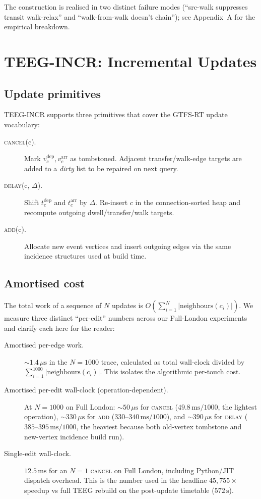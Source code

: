 \documentclass[letterpaper]{article}
\theoremstyle{definition}
\theoremstyle{plain}
\begin{document}
The construction is realised in two distinct failure modes
(``src-walk suppresses transit walk-relax'' and ``walk-from-walk
doesn't chain''); see Appendix~A for the empirical breakdown.

\section{TEEG-INCR: Incremental Updates}
\label{sec:teeg-incr}

\subsection{Update primitives}

TEEG-INCR supports three primitives that cover the GTFS-RT update vocabulary:
\begin{description}
\item[\textsc{cancel}(c).] Mark $v^\text{dep}_c, v^\text{arr}_c$ as
tombstoned. Adjacent transfer/walk-edge targets are added to a
\emph{dirty} list to be repaired on next query.
\item[\textsc{delay}(c, $\Delta$).] Shift $t^\text{dep}_c$ and
$t^\text{arr}_c$ by $\Delta$. Re-insert $c$ in the connection-sorted heap
and recompute outgoing dwell/transfer/walk targets.
\item[\textsc{add}(c).] Allocate new event vertices and insert outgoing edges
via the same incidence structures used at build time.
\end{description}

\subsection{Amortised cost}

The total work of a sequence of $N$ updates is
$O\left(\sum_{i=1}^N |\text{neighbours}(c_i)|\right)$. We measure three
distinct ``per-edit'' numbers across our Full-London experiments and
clarify each here for the reader:
\begin{description}
\item[Amortised per-edge work.] $\sim 1.4\,\mu\mathrm{s}$ in the
$N=1000$ trace, calculated as total wall-clock divided by
$\sum_{i=1}^{1000} |\text{neighbours}(c_i)|$. This isolates the
algorithmic per-touch cost.
\item[Amortised per-edit wall-clock (operation-dependent).] At
$N\!=\!1000$ on Full London: $\sim\!50\,\mu\mathrm{s}$ for
\textsc{cancel} ($49.8\,\text{ms}/1000$, the lightest operation),
$\sim\!330\,\mu\mathrm{s}$ for \textsc{add}
($330\text{--}340\,\text{ms}/1000$), and
$\sim\!390\,\mu\mathrm{s}$ for \textsc{delay}
($385\text{--}395\,\text{ms}/1000$, the heaviest because both
old-vertex tombstone and new-vertex incidence build run).
\item[Single-edit wall-clock.] $12.5\,\mathrm{ms}$ for an $N\!=\!1$
\textsc{cancel} on Full London, including Python/JIT dispatch
overhead. This is the number used in the headline $45{,}755\times$
speedup vs full TEEG rebuild on the post-update timetable
($572\,\mathrm{s}$).
\end{description}
\end{document}
